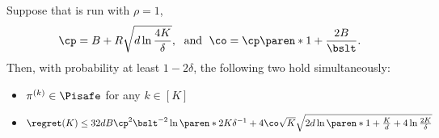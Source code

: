 \begin{theorem}\label{theorem:formal-regret}
Suppose that  is run with $\rho=1$,
\begin{align*}
\cp =B + R\sqrt{d \ln \frac{4K}{\delta}},
\; \text{ and }\;
\co = \cp \paren*{1 + \frac{2B}{\bslt}}.
\end{align*} 
Then, with probability at least $1-2\delta$, the following two hold simultaneously:
\begin{itemize}
    \item $\pi^{(k)} \in \Pisafe$ for any $k \in [K]$ 
    \item \( \regret (K) \leq 
32dB \cp^2\bslt^{-2}\ln\paren*{2K\delta^{-1}} +
4\co \sqrt{K} \sqrt{2d\ln \paren*{1 + \frac{K}{d}} + 4 \ln \frac{2K}{\delta}}
\)
\end{itemize}
\end{theorem}
